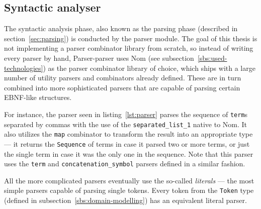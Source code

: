 \documentclass[english,engineering]{wizthesis}
\newcommand{\thisproject}{Parser-parser}
\begin{document}
\subsection{Syntactic analyser}

The syntactic analysis phase, also known as the parsing phase (described in
section~\ref{sec:parsing}) is conducted by the parser module. The goal of this
thesis is not implementing a parser combinator library from scratch, so instead
of writing every parser by hand, \thisproject{} uses Nom (see
subsection~\ref{sbs:used-technologies}) as the parser combinator library of
choice, which ships with a large number of utility parsers and combinators
already defined. These are in turn combined into more sophisticated parsers that
are capable of parsing certain EBNF-like structures.

For instance, the parser seen in listing~\ref{lst:parser} parses the sequence of
\texttt{term}s separated by commas with the use of the
\texttt{separated\_list\_1} native to Nom. It also utilizes the \texttt{map}
combinator to transform the result into an appropriate type --- it returns the
\texttt{Sequence} of terms in case it parsed two or more terms, or just the
single term in case it was the only one in the sequence. Note that this parser
uses the \texttt{term} and \texttt{concatenation\_symbol} parsers defined
in a similar fashion.


All the more complicated parsers eventually use the so-called \emph{literals}
--- the most simple parsers capable of parsing single tokens. Every token from
the \texttt{Token} type (defined in subsection~\ref{sbs:domain-modelling}) has
an equivalent literal parser.
\end{document}

